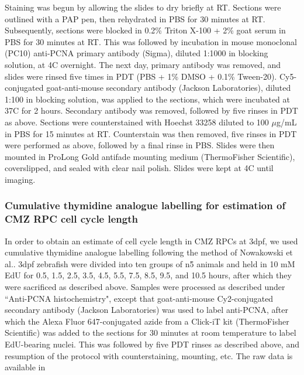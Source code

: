 \documentclass[10pt,letterpaper]{article}
\begin{document}
Staining was begun by allowing the slides to dry briefly at RT. Sections were outlined with a PAP pen, then rehydrated in PBS for 30 minutes at RT. Subsequently, sections were blocked in 0.2\% Triton X-100 + 2\% goat serum in PBS for 30 minutes at RT. This was followed by incubation in mouse monoclonal (PC10) anti-PCNA primary antibody (Sigma), diluted 1:1000 in blocking solution, at 4\textdegree C overnight. The next day, primary antibody was removed, and slides were rinsed five times in PDT (PBS + 1\% DMSO + 0.1\% Tween-20). Cy5-conjugated goat-anti-mouse secondary antibody (Jackson Laboratories), diluted 1:100 in blocking solution, was applied to the sections, which were incubated at 37\textdegree C for 2 hours. Secondary antibody was removed, followed by five rinses in PDT as above. Sections were counterstained with Hoechst 33258 diluted to 100 $\mu$g/mL in PBS for 15 minutes at RT. Counterstain was then removed, five rinses in PDT were performed as above, followed by a final rinse in PBS. Slides were then mounted in ProLong Gold antifade mounting medium (ThermoFisher Scientific), coverslipped, and sealed with clear nail polish. Slides were kept at 4\textdegree C until imaging.

\subsubsection*{Cumulative thymidine analogue labelling for estimation of CMZ RPC cell cycle length}
In order to obtain an estimate of cell cycle length in CMZ RPCs at 3dpf, we used cumulative thymidine analogue labelling following the method of Nowakowski et al.\cite{Nowakowski1989}. 3dpf zebrafish were divided into ten groups of n\=5 animals and held in 10 mM EdU for 0.5, 1.5, 2.5, 3.5, 4.5, 5.5, 7.5, 8.5, 9.5, and 10.5 hours, after which they were sacrificed as described above. Samples were processed as described under ``Anti-PCNA histochemistry", except that goat-anti-mouse Cy2-conjugated secondary antibody (Jackson Laboratories) was used to label anti-PCNA, after which the Alexa Fluor 647-conjugated azide from a Click-iT kit (ThermoFisher Scientific) was added to the sections for 30 minutes at room temperature to label EdU-bearing nuclei. This was followed by five PDT rinses as described above, and resumption of the protocol with counterstaining, mounting, etc. The raw data is available in 
\end{document}
